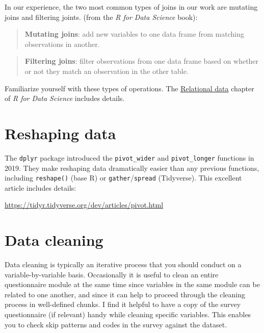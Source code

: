 \documentclass[
]{book}
\begin{document}
In our experience, the two most common types of joins in our work are mutating joins and filtering joints. (from the \emph{R for Data Science} book):

\begin{quote}
\textbf{Mutating joins}: add new variables to one data frame from matching observations in another.
\end{quote}

\begin{quote}
\textbf{Filtering joins}: filter observations from one data frame based on whether or not they match an observation in the other table.
\end{quote}

Familiarize yourself with these types of operations. The \href{https://r4ds.had.co.nz/relational-data.html}{Relational data} chapter of \emph{R for Data Science} includes details.

\hypertarget{reshaping-data}{%
\section{Reshaping data}\label{reshaping-data}}

The \texttt{dplyr} package introduced the \texttt{pivot\_wider} and \texttt{pivot\_longer} functions in 2019. They make reshaping data dramatically easier than any previous functions, including \texttt{reshape()} (base R) or \texttt{gather}/\texttt{spread} (Tidyverse). This excellent article includes details:

\url{https://tidyr.tidyverse.org/dev/articles/pivot.html}

\hypertarget{data-cleaning}{%
\section{Data cleaning}\label{data-cleaning}}

Data cleaning is typically an iterative process that you should conduct on a variable-by-variable basis. Occasionally it is useful to clean an entire questionnaire module at the same time since variables in the same module can be related to one another, and since it can help to proceed through the cleaning process in well-defined chunks. I find it helpful to have a copy of the survey questionnaire (if relevant) handy while cleaning specific variables. This enables you to check skip patterns and codes in the survey against the dataset.
\end{document}
